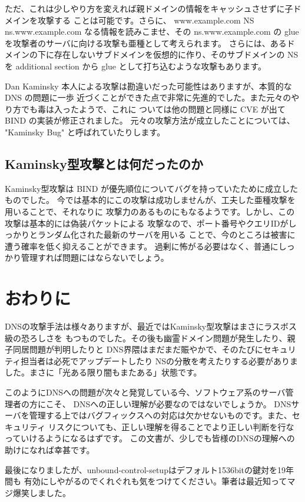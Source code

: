 ただ、これは少しやり方を変えれば親ドメインの情報をキャッシュさせずに子ドメインを攻撃する
ことは可能です。さらに、 www.example.com NS ns.www.example.com なる情報を読みこませ、その
ns.www.example.com の glue を攻撃者のサーバに向ける攻撃も亜種として考えられます。
さらには、あるドメインの下に存在しないサブドメインを仮想的に作り、そのサブドメインの NS を
additional section から glue として打ち込むような攻撃もあります。

Dan Kaminsky 本人による攻撃は勘違いだった可能性はありますが、本質的な DNS の問題に一歩
近づくことができた点で非常に先進的でした。また元々のやり方でも毒は入ったようで、これに
ついては他の問題と同様に CVE が出て BIND の実装が修正されました。
元々の攻撃方法が成立したことについては、 "Kaminsky Bug" と呼ばれていたりします。

\subsection{Kaminsky型攻撃とは何だったのか}
Kaminsky型攻撃は BIND が優先順位についてバグを持っていたために成立したものでした。
今では基本的にこの攻撃は成功しませんが、工夫した亜種攻撃を用いることで、それなりに
攻撃力のあるものにもなるようです。しかし、この攻撃は基本的には偽装パケットによる
攻撃なので、ポート番号やクエリIDがしっかりとランダム化された最新のサーバを用いる
ことで、今のところは被害に遭う確率を低く抑えることができます。
過剰に怖がる必要はなく、普通にしっかり管理すれば問題にはならないでしょう。


\section{おわりに}
DNSの攻撃手法は様々ありますが、最近ではKaminsky型攻撃はまさにラスボス級の恐ろしさを
もつものでした。その後も幽霊ドメイン問題が発生したり、親子同居問題が判明したりと
DNS界隈はまだまだ賑やかで、そのたびにセキュリティ担当者は必死でアップデートしたり
NSの分散を考えたりする必要がありました。まさに「光ある限り闇もまたある」状態です。

このようにDNSへの問題が次々と発覚している今、ソフトウェア系のサーバ管理者の方にこそ、
DNSへの正しい理解が必要なのではないでしょうか。
DNSサーバを管理する上ではバグフィックスへの対応は欠かせないものです。また、セキュリティ
リスクについても、正しい理解を得ることでより正しい判断を行なっていけるようになるはずです。
この文書が、少しでも皆様のDNSの理解への助けになれば幸甚です。

最後になりましたが、unbound-control-setupはデフォルト1536bitの鍵対を19年間も
有効にしやがるのでくれぐれも気をつけてください。筆者は最近知ってマジ爆笑しました。

